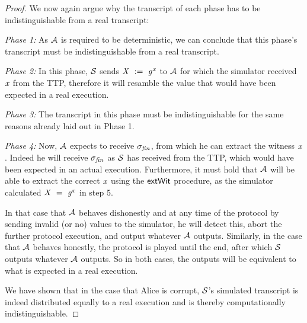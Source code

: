 \begin{proof}
    We now again argue why the transcript of each phase has to be indistinguishable from a real transcript:
    \begin{asparaitem}
        \item \textit{Phase 1:} As $\mathcal{A}$ is required to be deterministic, we can conclude that this phase's transcript must be indistinguishable from a real transcript.
        \item \textit{Phase 2:} In this phase, $\mathcal{S}$ sends $\mathit{X} ~:=~ \mathit{g}^{\mathit{x}}$ to $\mathcal{A}$ for which the simulator received $\mathit{x}$ from the TTP, therefore it will resamble the value that would have been expected in a real execution.
        \item \textit{Phase 3:} The transcript in this phase must be indistinguishable for the same reasons already laid out in Phase 1.
        \item \textit{Phase 4:} Now, $\mathcal{A}$ expects to receive $\sigma_{\mathit{fin}}$, from which he can extract the witness $\mathit{x}$.
        Indeed he will receive $\sigma_{\mathit{fin}}$ as $\mathcal{S}$ has received from the TTP, which would have been expected in an actual execution.
        Furthermore, it must hold that $\mathcal{A}$ will be able to extract the correct $\mathit{x}$ using the $\mathsf{extWit}$ procedure, as the simulator calculated $\mathit{X} ~=~ \mathit{g}^{\mathit{x}}$ in step 5.
        \item In that case that $\mathcal{A}$ behaves dishonestly and at any time of the protocol by sending invalid (or no) values to the simulator, he will detect this, abort the further protocol execution, and output whatever $\mathcal{A}$ outputs.
        Similarly, in the case that $\mathcal{A}$ behaves honestly, the protocol is played until the end, after which $\mathcal{S}$ outputs whatever $\mathcal{A}$ outputs.
        So in both cases, the outputs will be equivalent to what is expected in a real execution.
    \end{asparaitem}

    We have shown that in the case that Alice is corrupt, $\mathcal{S}$'s simulated transcript is indeed distributed equally to a real execution and is thereby computationally indistinguishable.


\end{proof}
